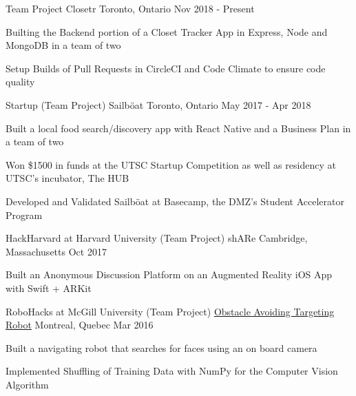 \begin{cventries}
\cventry
    {Team Project}
    {Closetr}
    {Toronto, Ontario}
    {Nov 2018 - Present}
    {
      \begin{cvitems}
        \item {Builting the Backend portion of a Closet Tracker App in Express, Node and MongoDB in a team of two}
        \item{Setup Builds of Pull Requests in CircleCI and Code Climate to ensure code quality}
      \end{cvitems}
    }
\cventry
  {Startup (Team Project)}
  {Sailböat}
  {Toronto, Ontario}
  {May 2017 - Apr 2018}
  {
    \begin{cvitems}
      \item {Built a local food search/discovery app with React Native and a Business Plan in a team of two}
      \item {Won \$1500 in funds at the UTSC Startup Competition as well as residency at UTSC's incubator, The HUB}
      \item {Developed and Validated Sailböat at Basecamp, the DMZ's Student Accelerator Program}
    \end{cvitems}
  }
\cventry
  {HackHarvard at Harvard University (Team Project)}
  {shARe}
  {Cambridge, Massachusetts}
  {Oct 2017}
  {
    \begin{cvitems}
      \item {Built an Anonymous Discussion Platform on an Augmented Reality iOS App with Swift + ARKit}
    \end{cvitems}
  }
\cventry
  {RoboHacks at McGill University (Team Project)}
  {\href{https://github.com/PhABC/HeadHunterBots}{Obstacle Avoiding Targeting Robot}}
  {Montreal, Quebec}
  {Mar 2016}
  {
    \begin{cvitems}
      \item {Built a navigating robot that searches for faces using an on board camera}
      \item {Implemented Shuffling of Training Data with NumPy for the Computer Vision Algorithm}
    \end{cvitems}
  }
\end{cventries}
